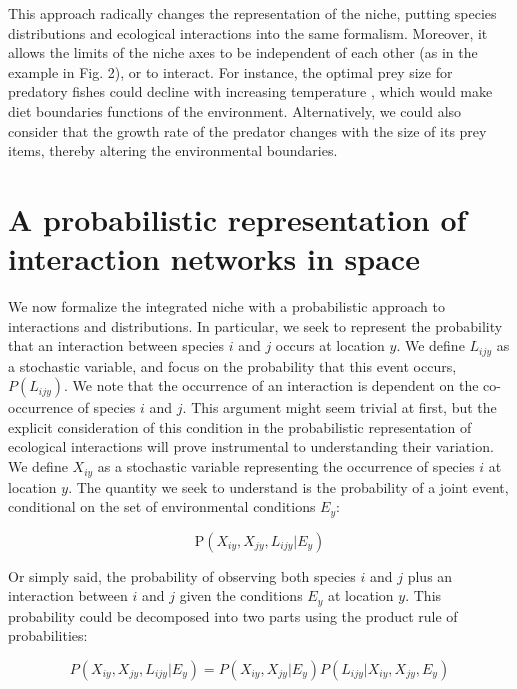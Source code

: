 \documentclass[12pt]{article}
\begin{document}
This approach radically changes the representation of the niche, putting
species distributions and ecological interactions into the same formalism.
Moreover, it allows the limits of the niche axes to be independent of each
other (as in the example in Fig. 2), or to interact. For instance, the optimal
prey size for predatory fishes could decline with increasing temperature
\citep{Gibert2014}, which would make diet boundaries functions of the
environment. Alternatively, we could also consider that the growth rate of the
predator changes with the size of its prey items, thereby altering the
environmental boundaries.

\section*{A probabilistic representation of interaction networks in space}

We now formalize the integrated niche with a probabilistic approach to
interactions and distributions. In particular, we seek to represent the
probability that an interaction between species $i$ and $j$ occurs at location
$y$. We define $L_{ijy}$ as a stochastic variable, and focus on the
probability that this event occurs, $P(L_{ijy})$. We note that the occurrence
of an interaction is dependent on the co-occurrence of species $i$ and $j$.
This argument might seem trivial at first, but the explicit consideration of
this condition in the probabilistic representation of ecological interactions
will prove instrumental to understanding their variation. We define $X_{iy}$
as a stochastic variable representing the occurrence of species $i$ at
location $y$. The quantity we seek to understand is the probability of a joint
event, conditional on the set of environmental conditions $E_y$:

\begin{equation}
	\text{P}(X_{iy},X_{jy},L_{ijy}|E_y)
\end{equation}

Or simply said, the probability of observing both species $i$ and $j$ plus an
interaction between $i$ and $j$ given the conditions $E_y$ at location $y$.
This probability could be decomposed into two parts using the product rule of
probabilities:

\begin{equation}
	P(X_{iy},X_{jy},L_{ijy}|E_y)=P(X_{iy},X_{jy}|E_y)P(L_{ijy}|X_{iy},X_{jy},E_y)
\end{equation}
\end{document}
